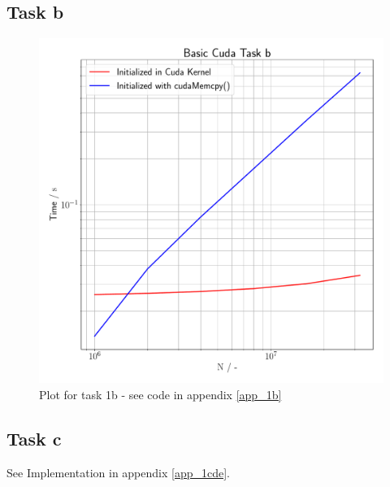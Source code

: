 \subsection{Task b}
\begin{figure}[h]
    \begin{center}
        \includegraphics[width=1\textwidth]{figures/task_1_b.pdf}
        \caption{Plot for task 1b - see code in appendix \ref{app_1b}}
        \label{task_1_b_plot}
    \end{center}
\end{figure} 
\pagebreak

\subsection{Task c}
See Implementation in appendix \ref{app_1cde}. \\
\null
